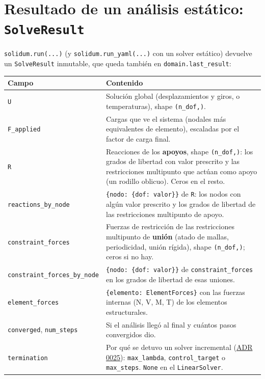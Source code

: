 \documentclass[11pt,oneside]{report}
\begin{document}
\section{Resultado de un análisis estático: \texttt{SolveResult}}

\texttt{solidum.run(...)} (y \texttt{solidum.\allowbreak{}run\_\allowbreak{}yaml(.\allowbreak{}.\allowbreak{}.\allowbreak{})} con un solver estático) devuelve un \texttt{SolveResult} inmutable, que queda también en \texttt{domain.\allowbreak{}last\_\allowbreak{}result}:

\begin{center}
\begin{tabularx}{\textwidth}{YY}
\hline
\textbf{Campo} & \textbf{Contenido} \\
\hline
\texttt{U} & Solución global (desplazamientos y giros, o temperaturas), shape \texttt{(n\_dof,)}. \\
\texttt{F\_applied} & Cargas que ve el sistema (nodales más equivalentes de elemento), escaladas por el factor de carga final. \\
\texttt{R} & Reacciones de los \textbf{apoyos}, shape \texttt{(n\_dof,)}: los grados de libertad con valor prescrito y las restricciones multipunto que actúan como apoyo (un rodillo oblicuo). Ceros en el resto. \\
\texttt{reactions\_\allowbreak{}by\_\allowbreak{}node} & \texttt{\{nodo: \{dof: valor\}\}} de \texttt{R}: los nodos con algún valor prescrito y los grados de libertad de las restricciones multipunto de apoyo. \\
\texttt{constraint\_\allowbreak{}forces} & Fuerzas de restricción de las restricciones multipunto de \textbf{unión} (atado de mallas, periodicidad, unión rígida), shape \texttt{(n\_dof,)}; ceros si no hay. \\
\texttt{constraint\_\allowbreak{}forces\_\allowbreak{}by\_\allowbreak{}node} & \texttt{\{nodo: \{dof: valor\}\}} de \texttt{constraint\_\allowbreak{}forces} en los grados de libertad de esas uniones. \\
\texttt{element\_forces} & \texttt{\{elemento: ElementForces\}} con las fuerzas internas (N, V, M, T) de los elementos estructurales. \\
\texttt{converged}, \texttt{num\_steps} & Si el análisis llegó al final y cuántos pasos convergidos dio. \\
\texttt{termination} & Por qué se detuvo un solver incremental (\href{https://github.com/jretamav/solidum-fem/blob/main/docs/adr/0025-terminacion-de-los-solvers-incrementales-y-registro.md}{ADR 0025}): \texttt{\textquotedbl{}max\_lambda\textquotedbl{}}, \texttt{\textquotedbl{}control\_target\textquotedbl{}} o \texttt{\textquotedbl{}max\_steps\textquotedbl{}}. \texttt{None} en el \texttt{LinearSolver}. \\

\end{tabularx}
\end{center}
\end{document}
